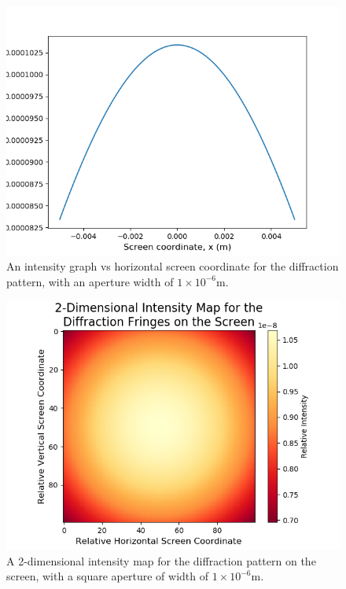 \documentclass[twocolumn,prl,nobalancelastpage,aps,10pt]{revtex4-1}
\begin{document}
\begin{figure}
	\includegraphics*[width=0.96\linewidth,clip]{1D_WIDTH1E-6}
	\caption{An intensity graph vs horizontal screen coordinate for the diffraction pattern, with an aperture width of $1\times10^{-6}$m.} \label{1D_WIDTH1E-6}
\end{figure}

\begin{figure}
	\includegraphics*[width=0.96\linewidth,clip]{2D_WIDTH1E-6}
	\caption{A 2-dimensional intensity map for the diffraction pattern on the screen, with a square aperture of width of $1\times10^{-6}$m.} \label{2D_WIDTH1E-6}
\end{figure}
\end{document}
